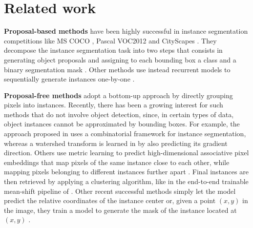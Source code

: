 
\section{Related work} \label{sec:related_work}
\textbf{Proposal-based methods} have been highly successful in instance segmentation competitions like MS COCO \cite{lin2014microsoft}, Pascal VOC2012 \cite{everingham2010pascal} and CityScapes \cite{cordts2016cityscapes}. They decompose the instance segmentation task into two steps that consists in generating object proposals and assigning to each bounding box a class and a binary segmentation mask \cite{he2017mask,porzi2019seamless,liu2018path,yang2012layered,li2017fully,ladicky2010and,hariharan2014simultaneous,chen2015multi,dai2016instance,liang2016reversible}. 
Other methods use instead recurrent models to sequentially generate instances one-by-one \cite{romera2016recurrent,ren2017end}.

\textbf{Proposal-free methods} adopt a bottom-up approach by directly grouping pixels into instances. Recently, there has been a growing interest for such  methods that do not involve object detection, since, in certain types of data, object instances cannot be approximated by bounding boxes. For example, the approach proposed in \cite{kirillov2017instancecut} uses a combinatorial framework for instance segmentation, 
whereas a watershed transform is learned in \cite{bai2017deep} by also predicting its gradient direction. 
Others use metric learning to predict high-dimensional associative pixel embeddings that map pixels of the same instance close to each other, while mapping pixels belonging to different instances further apart \cite{lee2019learning,fathi2017semantic,newell2017associative,de2017semantic}. %
Final instances are then retrieved by applying a clustering algorithm, like in the end-to-end trainable mean-shift pipeline of \cite{kong2018recurrentPix}. 
Other recent successful methods simply let the model predict the relative coordinates of the instance center \cite{neven2019instance,cheng2019panopticdeeplab} or, given a point $(x,y)$ in the image, they train a model to generate the mask of the instance located at $(x,y)$ \cite{sofiiuk2019adaptis}. 

